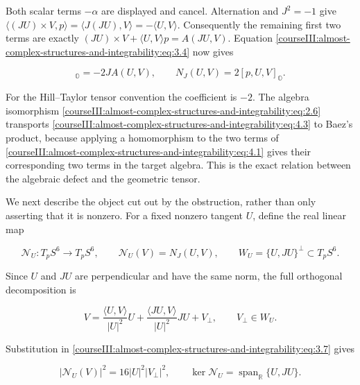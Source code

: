 Both scalar terms \(-\alpha\) are displayed and cancel. Alternation and \(J^2=-1\) give
\(\langle(JU)\times V,p\rangle=\langle J(JU),V\rangle=-\langle U,V\rangle\).
Consequently the remaining first two terms are exactly
\((JU)\times V+\langle U,V\rangle p=A(JU,V)\). Equation \eqref{courseIII:almost-complex-structures-and-integrability:eq:3.4} now gives

\begin{equation}
[p,U,V]_{\mathbb O}=-2JA(U,V),
\qquad \boxed{N_J(U,V)=2[p,U,V]_{\mathbb O}}.
\label{courseIII:almost-complex-structures-and-integrability:eq:4.3}
\end{equation}

For the Hill--Taylor tensor convention the coefficient is \(-2\). The algebra isomorphism \eqref{courseIII:almost-complex-structures-and-integrability:eq:2.6} transports \eqref{courseIII:almost-complex-structures-and-integrability:eq:4.3} to Baez's product, because applying a homomorphism to the two terms of \eqref{courseIII:almost-complex-structures-and-integrability:eq:4.1} gives their corresponding two terms in the target algebra. This is the exact relation between the algebraic defect and the geometric tensor.

We next describe the object cut out by the obstruction, rather than only asserting that it is nonzero. For a fixed nonzero tangent \(U\), define the real linear map

\begin{equation}
\mathcal N_U:T_pS^6\longrightarrow T_pS^6,
\qquad \mathcal N_U(V)=N_J(U,V),
\qquad W_U=\{U,JU\}^{\perp}\subset T_pS^6.
\label{courseIII:almost-complex-structures-and-integrability:eq:4.4}
\end{equation}

Since \(U\) and \(JU\) are perpendicular and have the same norm, the full orthogonal decomposition is

\begin{equation}
V=\frac{\langle U,V\rangle}{|U|^2}U
+\frac{\langle JU,V\rangle}{|U|^2}JU+V_\perp,
\qquad V_\perp\in W_U.
\label{courseIII:almost-complex-structures-and-integrability:eq:4.5}
\end{equation}

Substitution in \eqref{courseIII:almost-complex-structures-and-integrability:eq:3.7} gives

\begin{equation}
|\mathcal N_U(V)|^2=16|U|^2|V_\perp|^2,
\qquad \ker\mathcal N_U=\operatorname{span}_{\mathbb R}\{U,JU\}.
\label{courseIII:almost-complex-structures-and-integrability:eq:4.6}
\end{equation}

